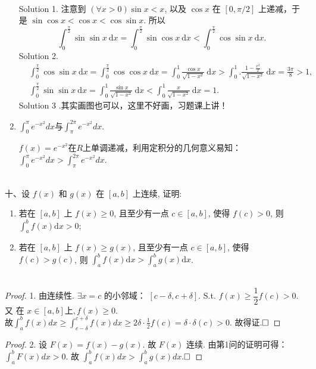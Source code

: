 \documentclass[lang=cn,newtx,10pt,scheme=chinese]{elegantbook}
\begin{document}
\begin{enumerate}
\begin{solution}\\
	Solution 1.
	注意到 $(\forall x>0) \sin x<x$, 以及 $\cos x$ 在 $[0, \pi / 2]$ 上递减，于是 $\sin \cos x<\cos x<\cos \sin x$. 所以
	$$
	\int_0^{\frac{\pi}{2}} \sin \sin x \mathrm{~d} x=\int_0^{\frac{\pi}{2}} \sin \cos x \mathrm{~d} x<\int_0^{\frac{\pi}{2}} \cos \sin x \mathrm{~d} x.
	$$
	Solution 2.
	$$
	\begin{aligned}
		& \int_0^{\frac{\pi}{2}} \cos \sin x \mathrm{~d} x=\int_0^{\frac{\pi}{2}} \cos \cos x \mathrm{~d} x=\int_0^1 \frac{\cos x}{\sqrt{1-x^2}} \mathrm{~d} x>\int_0^1. \frac{1-\frac{x^2}{2}}{\sqrt{1-x^2}} \mathrm{~d} x=\frac{3 \pi}{8}>1, \\
		& \int_0^{\frac{\pi}{2}} \sin \sin x \mathrm{~d} x=\int_0^1 \frac{\sin x}{\sqrt{1-x^2}} \mathrm{~d} x<\int_0^1 \frac{x}{\sqrt{1-x^2}} \mathrm{~d} x=1.
	\end{aligned}
	$$
		Solution 3 .其实画图也可以，这里不好画，习题课上讲！
\end{solution}
\item $\displaystyle\int_{0}^{\pi}e^{-x^2} dx$与$\displaystyle\int_{\pi}^{2\pi}e^{-x^2}dx  $.
\begin{solution}
	$f(x)=e^{-x^2}$在$R$上单调递减，利用定积分的几何意义易知：$\displaystyle\int_{0}^{\pi}e^{-x^2} dx>\displaystyle\int_{\pi}^{2\pi}e^{-x^2}dx.$
\end{solution}
\end{enumerate}

~\\
十、设 $f(x)$ 和 $g(x)$ 在 $[a, b]$ 上连续, 证明:
\begin{enumerate}
\item 若在 $[a, b]$ 上 $f(x) \geqslant 0$, 且至少有一点 $c \in[a, b]$, 使得 $f(c)>0$, 则 $\displaystyle\int_a^b f(x) \mathrm{d} x>0$; \\
\item 若在 $[a, b]$ 上 $f(x) \geqslant g(x)$, 且至少有一点 $c \in[a, b]$, 使得 $f(c)>g(c)$, 则 $\displaystyle\int_a^b f(x) \mathrm{d} x>\int_a^b g(x) \mathrm{d} x$.\\
	~\\
\end{enumerate}
\begin{proof}
	1. 由连续性. $\exists x=c$ 的小邻域： $[c-\delta, c+\delta]$. S.t. $f(x) \geqslant \dfrac{1}{2} f(c)>0$. 又 在 $x \in[a, b] $上$, f(x) \geqslant 0$.\\
	故$\displaystyle\int_a^b f(x) d x \geqslant \int_{c-\delta}^{c+\delta} f(x) d x \geqslant 2 \delta \cdot \frac{1}{2} f(c)=\delta \cdot \delta(c)>0$. 故得证.$\hfill\square$
\end{proof}
\begin{proof}2.
	设 $F(x)=f(x)-g(x)$. 故 $F(x)$ 连续. 由第1问的证明可得：$\displaystyle\int_a^b F(x) d x>0$. 故
	$\displaystyle\int_a^b f(x) d x>\int_a^b g(x) d x$.$\hfill\square$
\end{proof}
\end{document}
